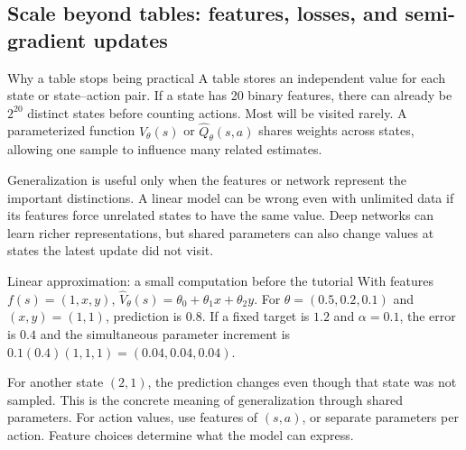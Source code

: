 \documentclass[10pt,a4paper]{article}
\begin{document}
\subsection{Scale beyond tables: features, losses, and semi-gradient updates}
\begin{card}{Why a table stops being practical}
A table stores an independent value for each state or state--action pair. If a state has 20 binary features, there can already be $2^{20}$ distinct states before counting actions. Most will be visited rarely. A parameterized function $\hat V_\theta(s)$ or $\hat Q_\theta(s,a)$ shares weights across states, allowing one sample to influence many related estimates.

Generalization is useful only when the features or network represent the important distinctions. A linear model can be wrong even with unlimited data if its features force unrelated states to have the same value. Deep networks can learn richer representations, but shared parameters can also change values at states the latest update did not visit.
\end{card}
\begin{card}{Linear approximation: a small computation before the tutorial}
With features $f(s)=(1,x,y)$, $\hat V_\theta(s)=\theta_0+\theta_1x+\theta_2y$. For $\theta=(0.5,0.2,0.1)$ and $(x,y)=(1,1)$, prediction is $0.8$. If a fixed target is $1.2$ and $\alpha=0.1$, the error is $0.4$ and the simultaneous parameter increment is $0.1(0.4)(1,1,1)=(0.04,0.04,0.04)$.

For another state $(2,1)$, the prediction changes even though that state was not sampled. This is the concrete meaning of generalization through shared parameters. For action values, use features of $(s,a)$, or separate parameters per action. Feature choices determine what the model can express.
\end{card}
\end{document}
